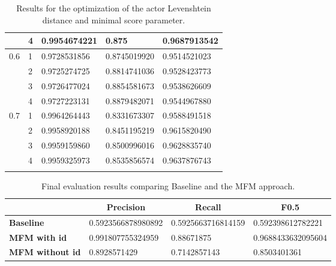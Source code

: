 \begin{longtable}{l|l|l|l|l}
					 & 4 & 0.9954674221 & 0.875        & 0.9687913542 \\ \hline
 \hline
\multirow{4}{*}{0.6} & 1 & 0.9728531856 & 0.8745019920 & 0.9514521023 \\ \hhline{~----}
					 & 2 & 0.9725274725 & 0.8814741036 & 0.9528423773 \\ \hhline{~----}
					 & 3 & 0.9726477024 & 0.8854581673 & 0.9538626609 \\ \hhline{~----}
					 & 4 & 0.9727223131 & 0.8879482071 & 0.9544967880 \\ \hline
 \hline
\multirow{4}{*}{0.7} & 1 & 0.9964264443 & 0.8331673307 & 0.9588491518 \\ \hhline{~----}
					 & 2 & 0.9958920188 & 0.8451195219 & 0.9615820490 \\ \hhline{~----}
					 & 3 & 0.9959159860 & 0.8500996016 & 0.9628835740 \\ \hhline{~----}
					 & 4 & 0.9959325973 & 0.8535856574 & 0.9637876743 \\ \hline

\caption{Results for the optimization of the actor Levenshtein distance and minimal score parameter.}
\label{tab_overlapScore}
\end{longtable}



\begin{table}[h!]
\centering
\begin{tabular}{l||l|l|l}
 &  \multicolumn{1}{|c|}{\bfseries Precision} &  \multicolumn{1}{|c|}{\bfseries Recall} &  \multicolumn{1}{|c}{\bfseries F0.5}
\\ \hline \hline

\textbf{Baseline}       & 0.5923566878980892 & 0.5925663716814159 & 0.592398612782221 \\ \hline
\textbf{MFM with id}    & 0.991807755324959 & 0.88671875 & 0.9688433632095604 \\ \hline
\textbf{MFM without id} & 0.8928571429 & 0.7142857143 & 0.8503401361 \\

\end{tabular}
\caption{Final evaluation results comparing Baseline and the MFM approach.}
\end{table}

